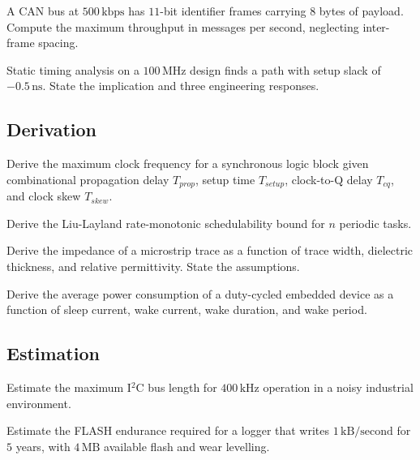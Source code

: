 \begin{exercise}
A CAN bus at $500\,\text{kbps}$ has $11$-bit identifier frames carrying $8$ bytes of payload. Compute the maximum throughput in messages per second, neglecting inter-frame spacing.
\end{exercise}

\begin{exercise}
Static timing analysis on a $100\,\text{MHz}$ design finds a path with setup slack of $-0.5\,\text{ns}$. State the implication and three engineering responses.
\end{exercise}

\subsection*{Derivation}

\begin{exercise}
Derive the maximum clock frequency for a synchronous logic block given combinational propagation delay $T_{prop}$, setup time $T_{setup}$, clock-to-Q delay $T_{cq}$, and clock skew $T_{skew}$.
\end{exercise}

\begin{exercise}
Derive the Liu-Layland rate-monotonic schedulability bound for $n$ periodic tasks.
\end{exercise}

\begin{exercise}
Derive the impedance of a microstrip trace as a function of trace width, dielectric thickness, and relative permittivity. State the assumptions.
\end{exercise}

\begin{exercise}
Derive the average power consumption of a duty-cycled embedded device as a function of sleep current, wake current, wake duration, and wake period.
\end{exercise}

\subsection*{Estimation}

\begin{exercise}
Estimate the maximum I$^2$C bus length for $400\,\text{kHz}$ operation in a noisy industrial environment.
\end{exercise}

\begin{exercise}
Estimate the FLASH endurance required for a logger that writes $1\,\text{kB}/\text{second}$ for $5$ years, with $4\,\text{MB}$ available flash and wear levelling.
\end{exercise}

